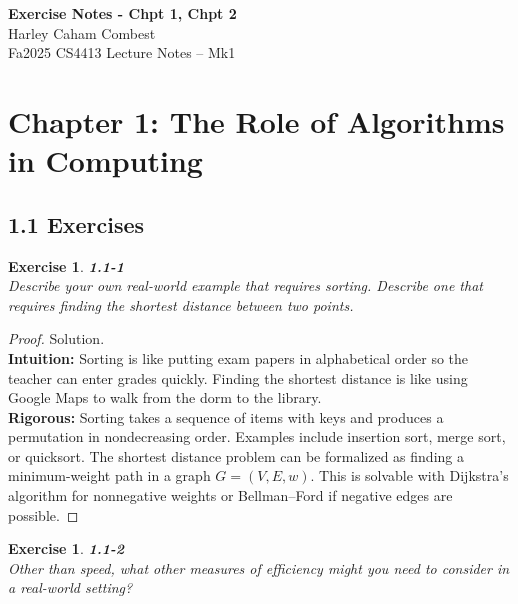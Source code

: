 \documentclass[12pt]{article}
\newtheorem{exercise}[theorem]{Exercise}
\theoremstyle{definition}
\begin{document}
\begin{center}
\Large\textbf{Exercise Notes - Chpt 1, Chpt 2} \\
\large Harley Caham Combest \\
\large Fa2025 CS4413 Lecture Notes – Mk1
\end{center}

\vspace{1em}

\dotfill
\section*{Chapter 1: The Role of Algorithms in Computing}
\dotfill

\vspace{1em}

\subsection*{1.1 Exercises}

\begin{exercise}
\noindent
\textbf{1.1-1}\\
\noindent
Describe your own real-world example that requires sorting. Describe one
that requires finding the shortest distance between two points.
\end{exercise}

\vspace{1pt}

\begin{proof}
Solution.\\

\noindent
\textbf{Intuition:} Sorting is like putting exam papers in alphabetical order so
the teacher can enter grades quickly. Finding the shortest distance is like
using Google Maps to walk from the dorm to the library.\\

\noindent
\textbf{Rigorous:} Sorting takes a sequence of items with keys and produces a
permutation in nondecreasing order. Examples include insertion sort,
merge sort, or quicksort. The shortest distance problem can be formalized
as finding a minimum-weight path in a graph $G=(V,E,w)$. This is solvable
with Dijkstra’s algorithm for nonnegative weights or Bellman–Ford if
negative edges are possible.
\end{proof}

\newpage

\begin{exercise}
\noindent
\textbf{1.1-2}\\
\noindent
Other than speed, what other measures of efficiency might you need to
consider in a real-world setting?
\end{exercise}
\end{document}
